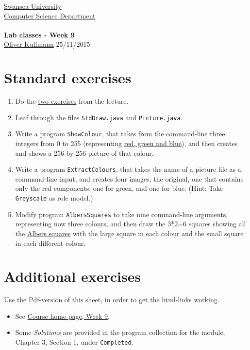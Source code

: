 \documentclass[11pt]{article}
\newcommand{\Java}{\lstset{language=Java,keywordstyle=\bfseries,breaklines,breakindent=30pt}}
\begin{document}
\begin{center}
  \href{http://www.swan.ac.uk/}{Swansea University}\\
  \href{http://www.swan.ac.uk/compsci/}{Computer Science Department}\\[1ex]
  \href{\chp}{\module}\\[1ex]
  \textbf{Lab classes - Week 9}\\
  \href{http://cs.swan.ac.uk/~csoliver}{Oliver Kullmann} 25/11/2015
\end{center}


\section{Standard exercises}
\label{sec:stdex}

\Java

\begin{enumerate}
\item Do the \href{\chp#PractiseLectureWeek09}{two exercises} from the lecture.
\item Leaf through the files \texttt{StdDraw.java} and \texttt{Picture.java}.
\item Write a program \texttt{ShowColour}, that takes from the command-line three integers from 0 to 255 (representing \href{http://en.wikipedia.org/wiki/RGB_color_model}{red, green and blue}), and then creates and shows a 256-by-256 picture of that colour.
\item Write a program \texttt{ExtractColours}, that takes the name of a picture file as a command-line input, and creates four images, the original, one that contains only the red components, one for green, and one for blue. (Hint: Take \texttt{Greyscale} as role model.)
\item Modify program \texttt{AlbersSquares} to take nine command-line arguments, representing now three colours, and then draw the 3*2=6 squares showing all the \href{http://en.wikipedia.org/wiki/Josef_Albers}{Albers squares} with the large square in each colour and the small square in each different colour.
\end{enumerate}


\section{Additional exercises}
\label{sec:addex}

Use the Pdf-version of this sheet, in order to get the html-links working.
\begin{itemize}
\item See \href{\chp#ExercisesWeek09}{Course home page, Week 9}.
\item Some \emph{Solutions} are provided in the program collection for the module, Chapter 3, Section 1, under \texttt{Completed}.
\end{itemize}
\end{document}
